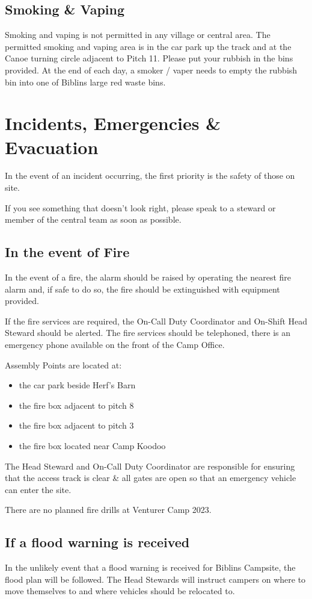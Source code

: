 \documentclass[a4paper, 11pt]{report}
\begin{document}
\section{Smoking \& Vaping}
Smoking and vaping is not permitted in any village or central area. The permitted smoking and vaping area is in the car park up the track and at the Canoe turning circle adjacent to Pitch 11. Please put your rubbish in the bins provided. At the end of each day, a smoker / vaper needs to empty the rubbish bin into one of Biblins large red waste bins.

\chapter{Incidents, Emergencies \& Evacuation}
In the event of an incident occurring, the first priority is the safety of those on site.\nl

If you see something that doesn't look right, please speak to a steward or member of the central team as soon as possible.

\section{In the event of Fire}
In the event of a fire, the alarm should be raised by operating the nearest fire alarm and, if safe to do so, the fire should be extinguished with equipment provided.\nl

If the fire services are required, the On-Call Duty Coordinator and On-Shift Head Steward should be alerted. The fire services should be telephoned, there is an emergency phone available on the front of the Camp Office.\nl

Assembly Points are located at:
\begin{itemize}
    \item the car park beside Herf's Barn
    \item the fire box adjacent to pitch 8
    \item the fire box adjacent to pitch 3
    \item the fire box located near Camp Koodoo
\end{itemize}

The Head Steward and On-Call Duty Coordinator are responsible for ensuring that the access track is clear \& all gates are open so that an emergency vehicle can enter the site.\nl

There are no planned fire drills at Venturer Camp 2023.

\section{If a flood warning is received}
In the unlikely event that a flood warning is received for Biblins Campsite, the flood plan will be followed. The Head Stewards will instruct campers on where to move themselves to and where vehicles should be relocated to.\nl
\end{document}
